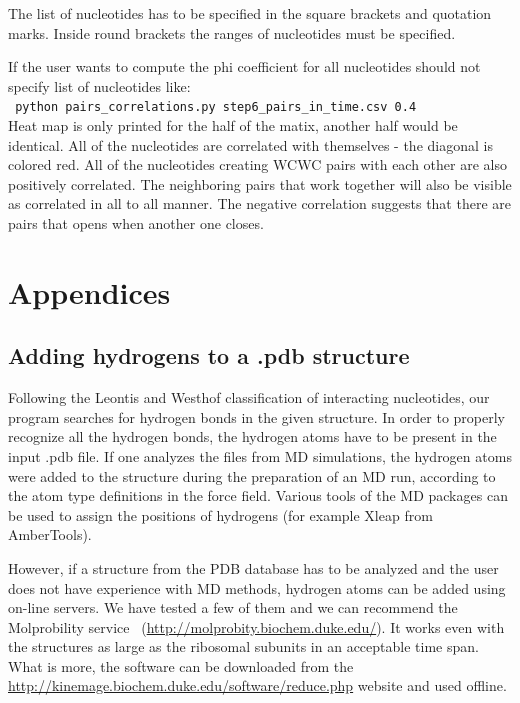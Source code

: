 \documentclass[12pt]{article}
\begin{document}
The list of nucleotides has to be specified in the square brackets and quotation marks. Inside round brackets the ranges of nucleotides must be specified. 

If the user wants to compute the phi coefficient for all nucleotides should not specify list of nucleotides like:\\
\texttt{ python pairs\_correlations.py step6\_pairs\_in\_time.csv 0.4 } \\

Heat map is only printed for the half of the matix, another half would be identical. All of the nucleotides are correlated with themselves - the diagonal is colored red. All of the nucleotides creating WCWC pairs with each other are also positively correlated. The neighboring pairs that work together will also be visible as correlated in all to all manner. The negative correlation suggests that there are pairs that opens when another one closes.


\section{Appendices}
\begin{appendices}
\subsection{Adding hydrogens to a .pdb structure}

Following the Leontis and Westhof \cite{Leontis2002} classification of interacting nucleotides, our program searches for hydrogen bonds in the given structure. In order to properly recognize all the hydrogen bonds, the hydrogen atoms have to be present in the input .pdb file. If one analyzes the files from MD simulations, the hydrogen atoms were added to the structure during the preparation of an MD run, according to the atom type definitions in the force field. Various tools of the MD packages can be used to assign the positions of hydrogens (for example Xleap from AmberTools). 

However, if a structure from the PDB database has to be analyzed and the user does not have experience with MD methods, hydrogen atoms can be added using on-line servers. We have tested a few of them and we can recommend the Molprobility service~\cite{Chen2010} (\url{http://molprobity.biochem.duke.edu/}). It works even with the structures as large as the ribosomal subunits in an acceptable time span. What is more, the software can be downloaded from the \url{http://kinemage.biochem.duke.edu/software/reduce.php} website and used offline.

\end{appendices}


\end{document}

